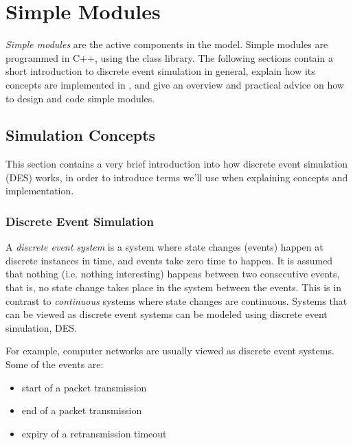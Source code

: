 \chapter{Simple Modules}
\label{cha:simple-modules}


\textit{Simple modules} are the active components in the model.
Simple modules are programmed in C++, using the {\opp} class
library. The following sections contain a short introduction
to discrete event simulation in general, explain how its concepts are
implemented in {\opp}, and give an overview and practical advice
on how to design and code simple modules.


\section{Simulation Concepts}
\label{sec:simple-modules:simulation-concepts}

This section contains a very brief introduction into how discrete
event simulation (DES) works, in order to introduce terms we'll use
when explaining {\opp} concepts and
implementation.


\subsection{Discrete Event Simulation}
\label{sec:simple-modules:discrete-event-simulation}

A \textit{discrete event system} is a system where state changes
(events) happen at discrete instances in time, and events take zero time
to happen. It is assumed that nothing (i.e. nothing interesting)
happens between two consecutive events, that is, no state change takes
place in the system between the events. This is in contrast to
\textit{continuous} systems where state changes are continuous.
Systems that can be viewed as discrete event systems can be modeled
using discrete event simulation, DES.

For example, computer networks are usually viewed as discrete
event systems. Some of the events are:

\begin{itemize}
  \item start of a packet transmission
  \item end of a packet transmission
  \item expiry of a retransmission timeout
\end{itemize}

